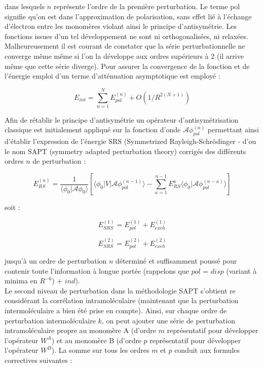 dans lesquels $n$ représente l’ordre de la première perturbation. Le terme \og pol \fg{} signifie qu’on est dans l'approximation de polarisation, sans effet lié à l’échange d’électron entre les monomères violant ainsi le principe d’antisymétrie. Les fonctions issues d’un tel développement ne sont ni orthogonalisées, ni relaxées.\\
   
Malheureusement il est courant de constater que la série perturbationnelle ne converge même même si l’on la développe aux ordres supérieurs à 2 (il arrive même que cette série diverge). Pour assurer la convergence de la fonction et de l’énergie emploi d’un terme d’atténuation asymptotique est employé : 
   
\begin{equation}
E_{int} = \sum_{n=1}^{N} E_{pol}^{(n)} + O(1/R^{2 (N+1)})
\end{equation}
   
Afin de rétablir le principe d’antisymétrie un opérateur d’antisymétrisation classique est initialement appliqué sur la fonction d’onde $\mathscr{A} \phi_{pol}^{(n)}$ permettant ainsi d’établir l’expression de l’énergie SRS (Symmetrized Rayleigh-Schr\"{o}dinger - d’ou le nom SAPT (symmetry adapted perturbation theory) corrigés des différents ordres $n$ de perturbation :
   	
\begin{equation}
E_{RS}^{(n)} = \frac{1}{\langle\phi_{0}|\mathscr{A}\phi_{0}\rangle} \left[\langle\phi_{0} | V| \mathscr{A} \phi_{pol}^{(n-1)}\rangle - \sum_{\kappa=1}^{n-1} E_{RS}^{\kappa} \langle \phi_{0}|\mathscr{A} \phi_{pol}^{(n-\kappa)}\rangle\right]
\end{equation}
   	
soit :
   	
\begin{equation}
E_{SRS}^{(1)} = E_{pol}^{(1)} + E_{exch}^{(1)}
\end{equation}
   	
\begin{equation}
E_{SRS}^{(2)} = E_{pol}^{(2)} + E_{exch}^{(2)}
\end{equation}
   	
jusqu’à un ordre de perturbation $n$ déterminé et suffisamment poussé pour contenir toute l’information à longue portée (rappelons que $pol$ = $disp$ (variant à minima en $R^{-6}$) + $ind$).\\
   		
   		
Le second niveau de perturbation dans la méthodologie SAPT s’obtient re considérant la corrélation intramoléculaire (maintenant que la perturbation intermoléculaire a bien été prise en compte). Ainsi, sur chaque ordre de perturbation intermoléculaire $k$, on peut ajouter une série de perturbation intramoléculaire propre au monomère A (d’ordre $m$ représentatif pour développer l’opérateur $W^{A}$) et au monomère B (d’ordre $p$ représentatif pour développer l’opérateur $W^{B}$). La somme sur tous les ordres $m$ et $p$ conduit aux formules correctives suivantes :
   		
